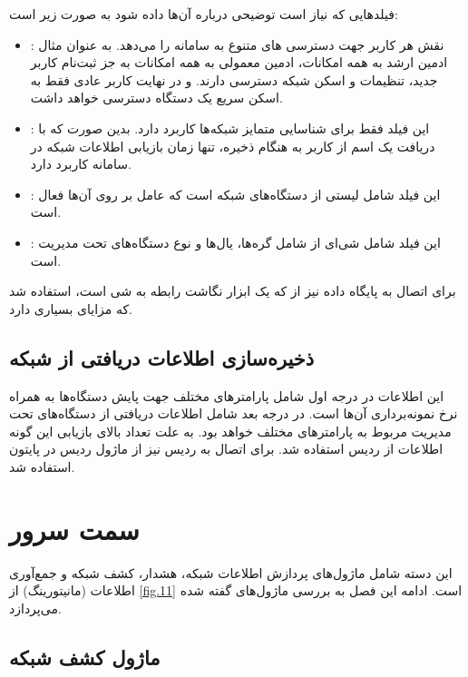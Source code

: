 فیلدهایی که نیاز است توضیحی درباره آن‌ها داده شود به صورت زیر است:

\begin{itemize}
    \item {}: نقش هر کاربر جهت دسترسی ‌های متنوع به سامانه را می‌دهد. به عنوان مثال ادمین ارشد به همه امکانات، ادمین معمولی به همه امکانات به جز ثبت‌نام کاربر جدید، تنظیمات و اسکن شبکه دسترسی دارند. و در نهایت کاربر عادی فقط به اسکن سریع یک دستگاه دسترسی خواهد داشت.
    \item {}: این فیلد فقط برای شناسایی متمایز شبکه‌ها کاربرد دارد. بدین صورت که با دریافت یک اسم از کاربر به هنگام ذخیره، تنها زمان بازیابی اطلاعات شبکه در سامانه کاربرد دارد.
    \item {}: این فیلد شامل لیستی از دستگاه‌های شبکه است که عامل  بر روی آن‌ها فعال است.
    \item {}: این فیلد شامل شی‌ای از  شامل گره‌ها، یال‌ها و نوع دستگاه‌های تحت مدیریت است.

\end{itemize}


برای اتصال به پایگاه داده  نیز از  که یک ابزار نگاشت رابطه به شی است، استفاده شد که مزایای بسیاری دارد.



\subsection{ذخیره‌سازی اطلاعات دریافتی از شبکه}

این اطلاعات در درجه اول شامل پارامتر‌های مختلف جهت پایش دستگاه‌ها به همراه نرخ نمونه‌برداری آن‌ها است. در درجه بعد شامل اطلاعات دریافتی از دستگاه‌های تحت مدیریت مربوط به پارامترهای مختلف خواهد بود. به علت تعداد بالای بازیابی این گونه اطلاعات از ردیس استفاده شد. برای اتصال به ردیس نیز از ماژول ردیس در پایتون استفاده شد.

\newpage

\section{سمت سرور}

این دسته شامل ماژول‌های پردازش اطلاعات شبکه، هشدار، کشف شبکه و جمع‌آوری اطلاعات (مانیتورینگ) از \cref{fig.11} است. ادامه این فصل به بررسی ماژول‌های گفته شده می‌پردازد.


\subsection{ماژول کشف شبکه}

